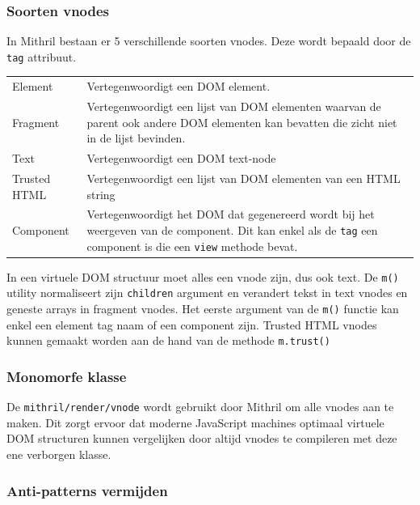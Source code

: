 \subsubsection{Soorten vnodes}

In Mithril bestaan er 5 verschillende soorten vnodes. Deze wordt bepaald door de \texttt{tag} attribuut. 

\begin{table}[!htbp]
    \begin{tabular}{p{} p{}}
        Element & Vertegenwoordigt een DOM element. \\
        Fragment & Vertegenwoordigt een lijst van DOM elementen waarvan de parent ook andere DOM elementen kan bevatten die zicht niet in de lijst bevinden. \\
        Text & Vertegenwoordigt een DOM text-node \\
        Trusted HTML & Vertegenwoordigt een lijst van DOM elementen van een HTML string \\
        Component & Vertegenwoordigt het DOM dat gegenereerd wordt bij het weergeven van de component. Dit kan enkel als de \texttt{tag} een component is die een \texttt{view} methode bevat.
    \end{tabular}
\end{table}
\autocite{Mithril2019g}

In een virtuele DOM structuur moet alles een vnode zijn, dus ook text. De \texttt{m()} utility normaliseert zijn \texttt{children} argument en verandert tekst in text vnodes en geneste arrays in fragment vnodes. Het eerste argument van de \texttt{m()} functie kan enkel een element tag naam of een component zijn. Trusted HTML vnodes kunnen gemaakt worden aan de hand van de methode \texttt{m.trust()} \autocite{Mithril2019g}

\subsubsection{Monomorfe klasse}

De \texttt{mithril/render/vnode} wordt gebruikt door Mithril om alle vnodes aan te maken. Dit zorgt ervoor dat moderne JavaScript machines optimaal virtuele DOM structuren kunnen vergelijken door altijd vnodes te compileren met deze ene verborgen klasse. \autocite{Mithril2019g}

\subsubsection{Anti-patterns vermijden}


